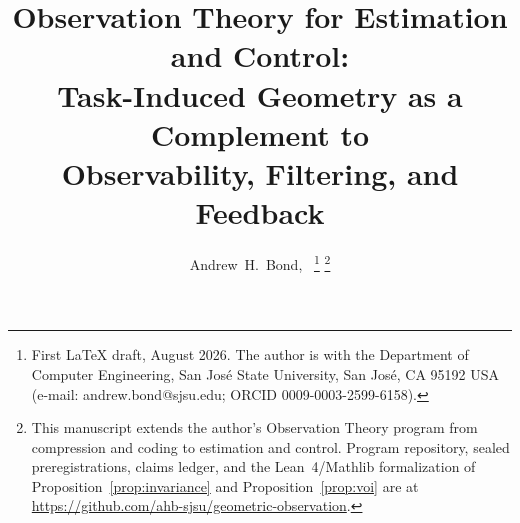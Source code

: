 \documentclass[letterpaper,onecolumn]{IEEEtran}
\theoremstyle{definition}
\theoremstyle{remark}
\begin{document}
\title{Observation Theory for Estimation and Control:\\
Task-Induced Geometry as a Complement to\\
Observability, Filtering, and Feedback}

\author{Andrew~H.~Bond,~%
\thanks{First LaTeX draft, August 2026. The author is with the Department of
Computer Engineering, San Jos\'e State University, San Jos\'e, CA 95192 USA
(e-mail: andrew.bond@sjsu.edu; ORCID 0009-0003-2599-6158).}%
\thanks{This manuscript extends the author's Observation Theory program from
compression and coding to estimation and control. Program repository, sealed
preregistrations, claims ledger, and the Lean~4/Mathlib formalization of
Proposition~\ref{prop:invariance} and Proposition~\ref{prop:voi} are at
\url{https://github.com/ahb-sjsu/geometric-observation}.}}

\maketitle
\end{document}
